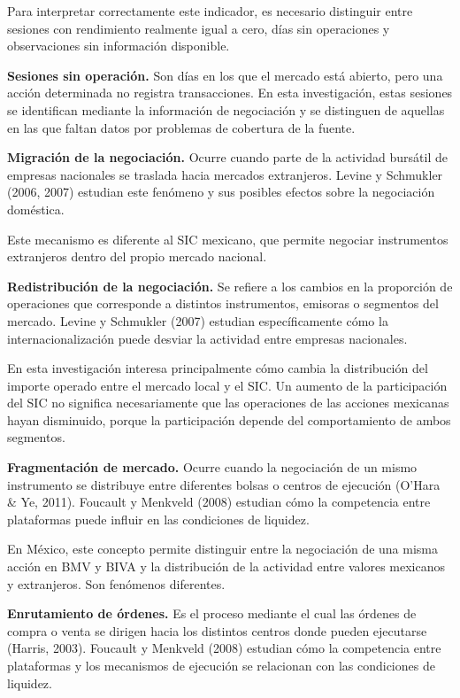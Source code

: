 Para interpretar correctamente este indicador, es necesario distinguir entre sesiones con rendimiento realmente igual a cero, días sin operaciones y observaciones sin información disponible.

\textbf{Sesiones sin operación.} Son días en los que el mercado está abierto, pero una acción determinada no registra transacciones. En esta investigación, estas sesiones se identifican mediante la información de negociación y se distinguen de aquellas en las que faltan datos por problemas de cobertura de la fuente.

\textbf{Migración de la negociación.} Ocurre cuando parte de la actividad bursátil de empresas nacionales se traslada hacia mercados extranjeros. Levine y Schmukler (2006, 2007) estudian este fenómeno y sus posibles efectos sobre la negociación doméstica.

Este mecanismo es diferente al SIC mexicano, que permite negociar instrumentos extranjeros dentro del propio mercado nacional.

\textbf{Redistribución de la negociación.} Se refiere a los cambios en la proporción de operaciones que corresponde a distintos instrumentos, emisoras o segmentos del mercado. Levine y Schmukler (2007) estudian específicamente cómo la internacionalización puede desviar la actividad entre empresas nacionales.

En esta investigación interesa principalmente cómo cambia la distribución del importe operado entre el mercado local y el SIC. Un aumento de la participación del SIC no significa necesariamente que las operaciones de las acciones mexicanas hayan disminuido, porque la participación depende del comportamiento de ambos segmentos.

\textbf{Fragmentación de mercado.} Ocurre cuando la negociación de un mismo instrumento se distribuye entre diferentes bolsas o centros de ejecución (O'Hara \& Ye, 2011). Foucault y Menkveld (2008) estudian cómo la competencia entre plataformas puede influir en las condiciones de liquidez.

En México, este concepto permite distinguir entre la negociación de una misma acción en BMV y BIVA y la distribución de la actividad entre valores mexicanos y extranjeros. Son fenómenos diferentes.

\textbf{Enrutamiento de órdenes.} Es el proceso mediante el cual las órdenes de compra o venta se dirigen hacia los distintos centros donde pueden ejecutarse (Harris, 2003). Foucault y Menkveld (2008) estudian cómo la competencia entre plataformas y los mecanismos de ejecución se relacionan con las condiciones de liquidez.

